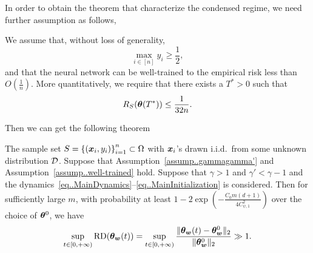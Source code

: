 \documentclass[twoside,11pt]{article}
\begin{document}
In order to obtain the theorem that characterize the condensed regime, we need further assumption as follows,
\begin{assump}\label{assump..well-trained}
    We assume that, without loss of generality,
    \begin{equation}
        \max\limits_{i\in[n]} y_i \geq \frac{1}{2},
    \end{equation}
    and that the neural network can be well-trained to the empirical risk less than $O(\frac{1}{n})$. More quantitatively, we require that there exists a $T^*>0$ such that
    \begin{equation}
        R_S(\bm{\theta}(T^*))\leq\frac{1}{32n}.
    \end{equation}
\end{assump}
Then we can get the following theorem
\begin{thm}\label{thm..CondensedRegime}
    The sample set $S = {\{(\bm{x}_i, y_i)\}}_{i=1}^n\subset\Omega$ with $\bm{x}_i$'s drawn i.i.d.\ from some unknown distribution $\mathcal{D}$. Suppose that Assumption~\ref{assump..gammagamma'} and Assumption~\ref{assump..well-trained} hold. Suppose that $\gamma>1$ and $\gamma'<\gamma-1$ and the dynamics~\eqref{eq..MainDynamics}--\eqref{eq..MainInitialization} is considered. Then for sufficiently large $m$, with probability at least $1-2\exp\left(-\frac{C_0m(d+1)}{4C_{\psi,1}^2}\right)$ over the choice of $\bm{\theta}^0$, we have
    \begin{equation}
        \sup\limits_{t\in[0,+\infty)}\mathrm{RD}(\bm{\theta}_{\bm{w}}(t))=\sup\limits_{t\in[0,+\infty)}\frac{\lVert\bm{\theta}_{\bm{w}}(t)-\bm{\theta}_{\bm{w}}^0\rVert_2}{\lVert\bm{\theta}_{\bm{w}}^0\rVert_2}\gg 1.
    \end{equation}
\end{thm}
\end{document}

